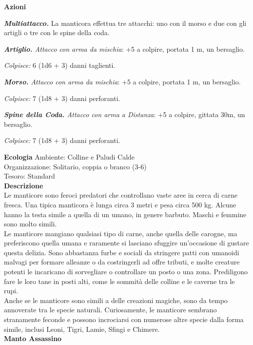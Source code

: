 \begin{multicols}{2}
\textbf{Azioni}

\emph{\textbf{Multiattacco.}} La manticora effettua tre attacchi: uno con il morso e due con gli artigli o tre con le spine della coda.

\emph{\textbf{Artiglio.} Attacco con arma da mischia}: +5 a colpire, portata 1 m, un bersaglio.

\emph{Colpisce:} 6 (1d6 + 3) danni taglienti.

\emph{\textbf{Morso.} Attacco con arma da mischia}: +5 a colpire, portata 1 m, un bersaglio.

\emph{Colpisce:} 7 (1d8 + 3) danni perforanti.

\emph{\textbf{Spine della Coda.} Attacco con arma a Distanza}: +5 a colpire, gittata 30m, un bersaglio.

\emph{Colpisce:} 7 (1d8 + 3) danni perforanti.

\textbf{Ecologia}
Ambiente: Colline e Paludi Calde\\
Organizzazione: Solitario, coppia o branco (3-6)\\
Tesoro: Standard\\

\textbf{Descrizione}\\
Le manticore sono feroci predatori che controllano vaste aree in cerca di carne fresca. Una tipica manticora è lunga circa 3 metri e pesa circa 500 kg. Alcune hanno la testa simile a quella di un umano, in genere barbuto. Maschi e femmine sono molto simili.\\

Le manticore mangiano qualsiasi tipo di carne, anche quella delle carogne, ma preferiscono quella umana e raramente si lasciano sfuggire un'occasione di gustare questa delizia. Sono abbastanza furbe e sociali da stringere patti con umanoidi malvagi per formare alleanze o da costringerli ad offre tributi, e molte creature potenti le incaricano di sorvegliare o controllare un posto o una zona. Prediligono fare le loro tane in posti alti, come le sommità delle colline e le caverne tra le rupi.\\

Anche se le manticore sono simili a delle creazioni magiche, sono da tempo annoverate tra le specie naturali. Curiosamente, le manticore sembrano stranamente feconde e possono incrociarsi con numerose altre specie dalla forma simile, inclusi Leoni, Tigri, Lamie, Sfingi e Chimere.\\


\medskip{}\textbf{Manto Assassino}


\end{multicols}
